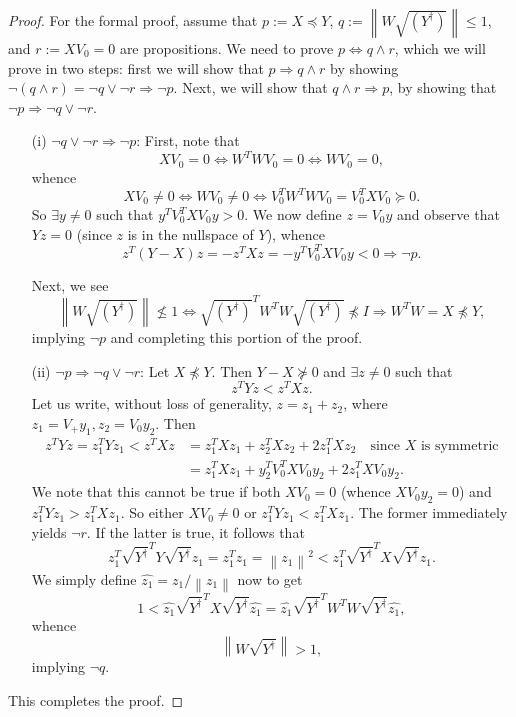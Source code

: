 \documentclass[11pt]{article}
\newcommand{\norm}[1]{\left\|#1\right\|}
\newcommand{\Leq}{\preceq}
\newcommand{\Geq}{\succeq}
\begin{document}
\begin{proof}
For the formal proof, assume that $p:= X \Leq Y$, $q:= \norm{W \sqrt{(Y^{\dagger})} } \leq 1$, and $r:= X V_0 = 0 $ are propositions. We need to prove $p \Leftrightarrow q \wedge r$, which we will prove in two steps: first we will show that $p \Rightarrow q \wedge r$ by showing $\neg(q \wedge r) = \neg q \vee \neg r \Rightarrow \neg p.$ Next, we will show that $q \wedge r \Rightarrow p$, by showing that $\neg p \Rightarrow \neg q \vee \neg r$.
\begin{enumerate}
\item[(i)]$\neg q \vee \neg r \Rightarrow \neg p$: First, note that 
\[ XV_0 = 0 \Leftrightarrow W^T W V_0 = 0 \Leftrightarrow WV_0 = 0, \]
whence
\[ XV_0 \neq 0 \Leftrightarrow WV_0 \neq 0 \Leftrightarrow V_0 ^T W^T W V_0 = V_0 ^T X V_0 \Geq 0. \]
So $\exists y \neq 0$ such that $y^T V_0 ^T X V_0 y > 0$. We now define $z = V_0 y$ and observe that $Y z = 0$ (since $z$ is in the nullspace of $Y$), whence
\[ z^T (Y - X) z = - z^T X z = - y^T V_0 ^T X V_0 y  < 0 \Rightarrow \neg p. \]

Next, we see
\[ \norm{W \sqrt{(Y^{\dagger})} } \not \leq 1 \Leftrightarrow \sqrt{(Y^{\dagger})} ^T W^T W \sqrt{(Y^{\dagger})} \not \Leq I  \Rightarrow W^T W = X \not \Leq Y, \]
implying $\neg p$ and completing this portion of the proof.

\item[(ii)] $\neg p \Rightarrow \neg q \vee \neg r$: Let $X \not \Leq Y$. Then $Y - X \not \Geq 0$ and $\exists z \neq 0$ such that
\[ z^T Y z < z^T X z. \]
Let us write, without loss of generality, $z = z_1 + z_2$, where $z_1 = V_+ y_1, z_2 = V_0 y_2$. Then 
\begin{align*}
z^T Y z = z_1 ^T Y z_1 < z^T X z &= z_1 ^T X z_1 + z_2 ^T X z_2 + 2 z_1 ^T X z_2 \quad \text{since }X \text{ is symmetric}\\
&= z_1 ^T X z_1 + y_2 ^T V_0 ^T X V_0 y_2 + 2 z_1 ^T X V_0 y_2.
\end{align*}
We note that this cannot be true if both $XV_0 = 0$ (whence $X V_0 y_2 = 0$) and $z_1 ^T Y z_1 > z_1 ^T X z_1$. So either $XV_0 \neq 0$ or $z_1 ^T Y z_1 < z_1 ^T X z_1$. The former immediately yields $\neg r$. If the latter is true, it follows that
\[ z_1 ^T \sqrt{Y^{\dagger}}^T Y \sqrt{Y^{\dagger}} z_1 = z_1 ^T z_1 = \norm{z_1}^2 < z_1 ^T \sqrt{Y^{\dagger}}^T X \sqrt{Y^{\dagger}} z_1. \]
We simply define $\hat{z_1} = z_1 / \norm{z_1}$ now to get 
\[ 1 < \hat{z_1} \sqrt{Y^{\dagger}}^T X \sqrt{Y^{\dagger}} \hat{z_1} = \hat{z_1} \sqrt{Y^{\dagger}}^T W^T W \sqrt{Y^{\dagger}} \hat{z_1}, \]
whence
\[ \norm{W \sqrt{Y^{\dagger}}} > 1,\]
implying $\neg q$.
\end{enumerate}
This completes the proof.
\end{proof}
\end{document}
